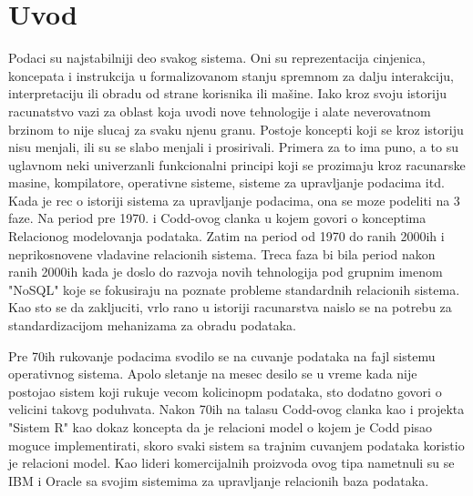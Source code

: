 \documentclass[12pt,oneside]{memoir}
\begin{document}
\frontmatter
\naslovna
\komisija
\apstrakt
\tableofcontents*

\mainmatter

\chapter{Uvod}

Podaci su najstabilniji deo svakog sistema. Oni su reprezentacija cinjenica, koncepata i instrukcija u formalizovanom stanju spremnom za dalju interakciju, interpretaciju ili obradu od strane korisnika ili mašine. Iako kroz svoju istoriju racunatstvo vazi za oblast koja uvodi nove tehnologije i alate neverovatnom brzinom to  nije slucaj za svaku njenu granu. Postoje koncepti koji se kroz istoriju nisu menjali, ili su se slabo menjali i prosirivali. Primera za to ima puno, a to su uglavnom neki univerzanli funkcionalni principi koji se prozimaju kroz racunarske masine, kompilatore, operativne sisteme, sisteme za upravljanje podacima itd. Kada je rec o istoriji sistema za upravljanje podacima, ona se moze podeliti na 3 faze. Na period pre 1970. i Codd-ovog clanka u kojem govori o konceptima Relacionog modelovanja podataka.  Zatim na period od 1970 do ranih 2000ih i neprikosnovene vladavine relacionih sistema. Treca faza bi bila period nakon ranih 2000ih kada je doslo do razvoja novih tehnologija pod grupnim imenom "NoSQL"  koje se fokusiraju na poznate probleme standardnih relacionih sistema. Kao sto se da zakljuciti, vrlo rano u istoriji racunarstva naislo se na potrebu za standardizacijom mehanizama za obradu podataka.

Pre 70ih rukovanje podacima svodilo se na cuvanje podataka na fajl sistemu operativnog sistema. Apolo sletanje na mesec desilo se u vreme kada nije postojao sistem koji rukuje vecom kolicinopm podataka, sto dodatno govori o velicini takovg poduhvata. Nakon 70ih na talasu Codd-ovog clanka kao i projekta "Sistem R" kao dokaz koncepta da je relacioni model o kojem je Codd pisao moguce implementirati, skoro svaki sistem sa trajnim cuvanjem podataka koristio je  relacioni model. Kao lideri komercijalnih proizvoda ovog tipa nametnuli su se IBM i Oracle sa svojim sistemima za upravljanje relacionih baza podataka.
\end{document}
